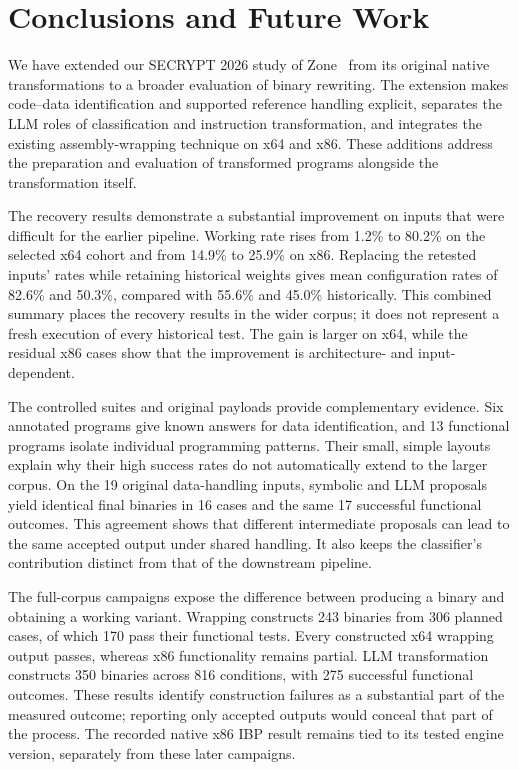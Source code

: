 \section{Conclusions and Future Work}\label{sec:conclusion3}\label{sec:extension_limits}
We have extended our SECRYPT 2026 study of Zone~\cite{zone_secrypt_2026}
from its original native transformations to a broader evaluation of
binary rewriting. The extension makes code--data identification and
supported reference handling explicit, separates the LLM roles of
classification and instruction transformation, and integrates the
existing assembly-wrapping technique on x64 and x86. These additions
address the preparation and evaluation of transformed programs alongside
the transformation itself.

The recovery results demonstrate a substantial improvement on inputs
that were difficult for the earlier pipeline. Working rate rises from
1.2\% to 80.2\% on the selected x64 cohort and from 14.9\% to 25.9\% on
x86. Replacing the retested inputs' rates while retaining historical
weights gives mean configuration rates of 82.6\% and 50.3\%, compared
with 55.6\% and 45.0\% historically. This combined summary places the
recovery results in the wider corpus; it does not represent a fresh
execution of every historical test. The gain is larger on x64, while
the residual x86 cases show that the improvement is architecture- and
input-dependent.

The controlled suites and original payloads provide complementary
evidence. Six annotated programs give known answers for data
identification, and 13 functional programs isolate individual programming
patterns. Their small, simple layouts explain why their high success
rates do not automatically extend to the larger corpus. On the 19
original data-handling inputs, symbolic and LLM proposals yield identical
final binaries in 16 cases and the same 17 successful functional outcomes.
This agreement shows that different intermediate proposals can lead to
the same accepted output under shared handling. It also keeps the
classifier's contribution distinct from that of the downstream pipeline.

The full-corpus campaigns expose the difference between producing a
binary and obtaining a working variant. Wrapping constructs 243 binaries
from 306 planned cases, of which 170 pass their functional tests. Every
constructed x64 wrapping output passes, whereas x86 functionality remains
partial. LLM transformation constructs 350 binaries across 816 conditions,
with 275 successful functional outcomes. These results identify
construction failures as a substantial part of the measured outcome;
reporting only accepted outputs would conceal that part of the process.
The recorded native x86 IBP result remains tied to its tested engine
version, separately from these later campaigns.

